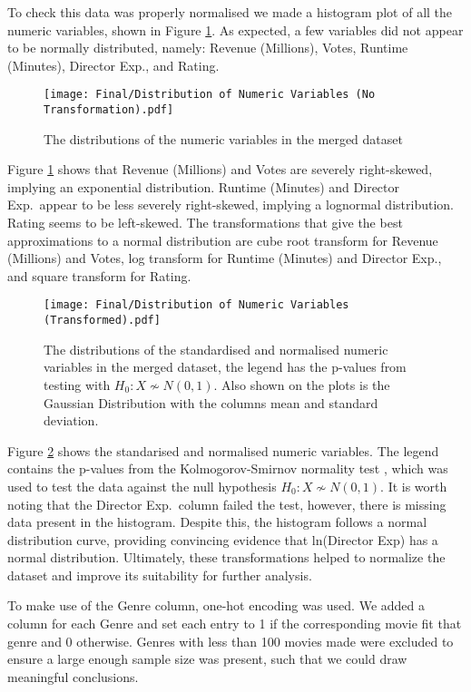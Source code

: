         To check this data was properly normalised we made a histogram plot of all the
            numeric variables, shown in Figure \ref{fig-distribution-of-numeric-variable}.
        As expected, a few variables did not appear to be normally distributed, namely:
        Revenue (Millions), Votes, Runtime (Minutes), Director Exp., and Rating.
        \begin{figure}[H]
            \centering
            \texttt{[image: Final/Distribution of Numeric Variables (No Transformation).pdf]}
            \caption[short]{The distributions of the numeric variables in the merged dataset}\label{fig-distribution-of-numeric-variable}
        \end{figure}
        Figure \ref*{fig-distribution-of-numeric-variable} shows that Revenue
            (Millions) and Votes are severely right-skewed, implying an exponential
            distribution.
        Runtime (Minutes) and Director Exp.~appear to be less severely right-skewed,
            implying a lognormal distribution.
        Rating seems to be left-skewed.
        The transformations that give the best approximations to a normal distribution
            are cube root transform for Revenue (Millions) and Votes, log transform for
            Runtime (Minutes) and Director Exp., and square transform for Rating.
        \begin{figure}[H]
            \centering
            \texttt{[image: Final/Distribution of Numeric Variables (Transformed).pdf]}
            \caption[short]{
                The distributions of the standardised and normalised numeric variables in the merged dataset,
                the legend has the p-values from testing with $H_{0}: X \not\sim N(0,1)$.
                Also shown on the plots is the Gaussian Distribution with the columns mean and
                    standard deviation.
            }\label{fig-transformed-distribution-of-numeric-variable}
        \end{figure}
        Figure \ref*{fig-transformed-distribution-of-numeric-variable} shows the
            standarised and normalised numeric variables.
        The legend contains the p-values from the Kolmogorov-Smirnov normality test
            \cite*{KStest}, which was used to test the data against the null hypothesis
            $H_{0}: X \not\sim N(0,1)$.
        It is worth noting that the Director Exp.~column failed the test, however,
            there is missing data present in the histogram.
        Despite this, the histogram follows a normal distribution curve, providing
            convincing evidence that ln(Director Exp) has a normal distribution.
        Ultimately, these transformations helped to normalize the dataset and improve
            its suitability for further analysis.

        To make use of the Genre column, one-hot encoding was used.
        We added a column for each Genre and set each entry to 1 if the corresponding
            movie fit that genre and 0 otherwise.
        Genres with less than 100 movies made were excluded to ensure a large enough
            sample size was present, such that we could draw meaningful conclusions.
